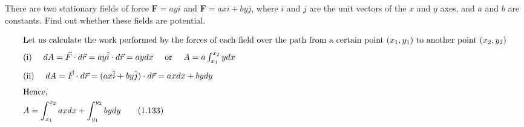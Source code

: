 \item There are two stationary fields of force $\mathbf{F} = ayi$ and $\mathbf{F} = axi + byj$, where $i$ and $j$ are the unit vectors of the $x$ and $y$ axes, and $a$ and $b$ are constants. Find out whether these fields are potential.\begin{solution}
   \begin{align*}
        \intertext{Let us calculate the work performed by the forces of each field over the path from a certain point \( (x_1, y_1) \) to another point \( (x_2, y_2) \)}
        \intertext{(i) \quad \( dA = \vec{F} \cdot d\vec{r} = ay\hat{i} \cdot d\vec{r} = aydx \) \quad or \quad \( A = a \int_{x_1}^{x_2} ydx \)}
        \intertext{(ii) \quad \( dA = \vec{F} \cdot d\vec{r} = (ax\hat{i} + by\hat{j}) \cdot d\vec{r} = axdx + bydy \)}
        \intertext{Hence,}
        A &= \int_{x_1}^{x_2} axdx + \int_{y_1}^{y_2} bydy \tag{1.133}
    \end{align*}
\end{solution}